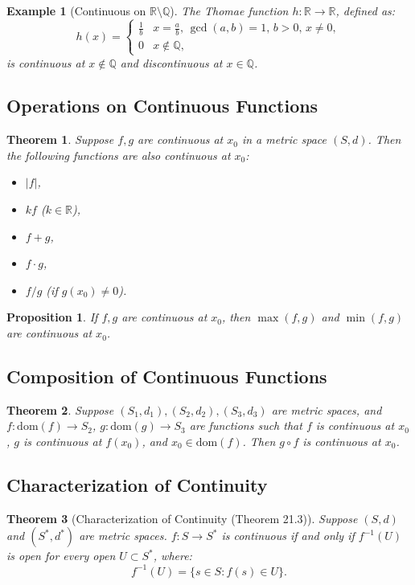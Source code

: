 \documentclass[9pt]{article}
\theoremstyle{definition}
\theoremstyle{plain}
\newtheorem{theorem}{Theorem}
\newtheorem{proposition}{Proposition}
\newtheorem{example}{Example}
\begin{document}
\begin{example}[Continuous on \( \mathbb{R} \setminus \mathbb{Q} \)]
The Thomae function \( h : \mathbb{R} \to \mathbb{R} \), defined as:
\[
h(x) =
\begin{cases}
\frac{1}{b} & x = \frac{a}{b}, \, \gcd(a, b) = 1, \, b > 0, \, x \neq 0, \\
0 & x \notin \mathbb{Q},
\end{cases}
\]
is continuous at \( x \notin \mathbb{Q} \) and discontinuous at \( x \in \mathbb{Q} \).
\end{example}

\subsection*{Operations on Continuous Functions}
\begin{theorem}
Suppose \( f, g \) are continuous at \( x_0 \) in a metric space \( (S, d) \). Then the following functions are also continuous at \( x_0 \):
\begin{itemize}
    \item \( |f| \),
    \item \( kf \) (\( k \in \mathbb{R} \)),
    \item \( f + g \),
    \item \( f \cdot g \),
    \item \( f / g \) (if \( g(x_0) \neq 0 \)).
\end{itemize}
\end{theorem}

\begin{proposition}
If \( f, g \) are continuous at \( x_0 \), then \( \max(f, g) \) and \( \min(f, g) \) are continuous at \( x_0 \).
\end{proposition}

\subsection*{Composition of Continuous Functions}
\begin{theorem}
Suppose \( (S_1, d_1), (S_2, d_2), (S_3, d_3) \) are metric spaces, and \( f : \text{dom}(f) \to S_2 \), \( g : \text{dom}(g) \to S_3 \) are functions such that \( f \) is continuous at \( x_0 \), \( g \) is continuous at \( f(x_0) \), and \( x_0 \in \text{dom}(f) \). Then \( g \circ f \) is continuous at \( x_0 \).
\end{theorem}

\subsection*{Characterization of Continuity}
\begin{theorem}[Characterization of Continuity (Theorem 21.3)]
Suppose \( (S, d) \) and \( (S^*, d^*) \) are metric spaces. \( f : S \to S^* \) is continuous if and only if \( f^{-1}(U) \) is open for every open \( U \subset S^* \), where:
\[
f^{-1}(U) = \{s \in S : f(s) \in U\}.
\]
\end{theorem}
\end{document}
